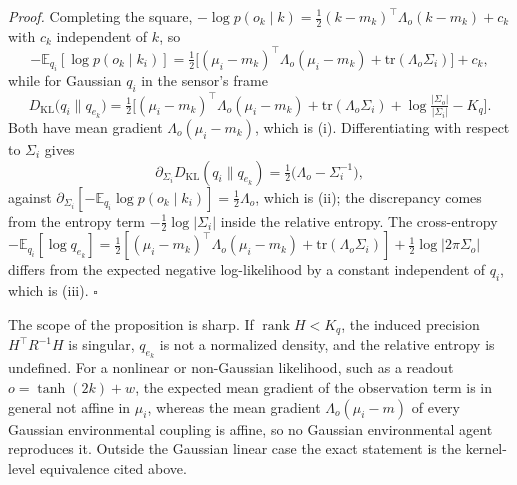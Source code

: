 \documentclass[11pt]{article}
\begin{document}
\noindent\emph{Proof.} Completing the square, $-\log p(o_k\mid k) = \tfrac{1}{2}(k - m_k)^\top \Lambda_o (k - m_k) + c_k$ with $c_k$ independent of $k$, so
\begin{equation}
-\mathbb{E}_{q_i}[\log p(o_k\mid k_i)] = \tfrac{1}{2}\big[(\mu_i - m_k)^\top \Lambda_o (\mu_i - m_k) + \mathrm{tr}(\Lambda_o \Sigma_i)\big] + c_k,
\end{equation}
while for Gaussian $q_i$ in the sensor's frame
\begin{equation}
D_{\mathrm{KL}}\big(q_i \| q_{e_k}\big) = \tfrac{1}{2}\big[(\mu_i - m_k)^\top \Lambda_o (\mu_i - m_k) + \mathrm{tr}(\Lambda_o \Sigma_i) + \log\tfrac{|\Sigma_o|}{|\Sigma_i|} - K_q\big].
\end{equation}
Both have mean gradient $\Lambda_o(\mu_i - m_k)$, which is (i). Differentiating with respect to $\Sigma_i$ gives
\begin{equation}
\partial_{\Sigma_i}D_{\mathrm{KL}}(q_i \| q_{e_k}) = \tfrac{1}{2}\big(\Lambda_o - \Sigma_i^{-1}\big),
\end{equation}
against $\partial_{\Sigma_i}[-\mathbb{E}_{q_i}\log p(o_k \mid k_i)] = \tfrac{1}{2}\Lambda_o$, which is (ii); the discrepancy comes from the entropy term $-\tfrac{1}{2}\log|\Sigma_i|$ inside the relative entropy. The cross-entropy $-\mathbb{E}_{q_i}[\log q_{e_k}] = \tfrac{1}{2}[(\mu_i - m_k)^\top \Lambda_o (\mu_i - m_k) + \mathrm{tr}(\Lambda_o \Sigma_i)] + \tfrac{1}{2}\log|2\pi\Sigma_o|$ differs from the expected negative log-likelihood by a constant independent of $q_i$, which is (iii). $\square$

The scope of the proposition is sharp. If $\operatorname{rank} H < K_q$, the induced precision $H^\top R^{-1}H$ is singular, $q_{e_k}$ is not a normalized density, and the relative entropy is undefined. For a nonlinear or non-Gaussian likelihood, such as a readout $o = \tanh(2k) + w$, the expected mean gradient of the observation term is in general not affine in $\mu_i$, whereas the mean gradient $\Lambda_o(\mu_i - m)$ of every Gaussian environmental coupling is affine, so no Gaussian environmental agent reproduces it. Outside the Gaussian linear case the exact statement is the kernel-level equivalence cited above.
\end{document}
